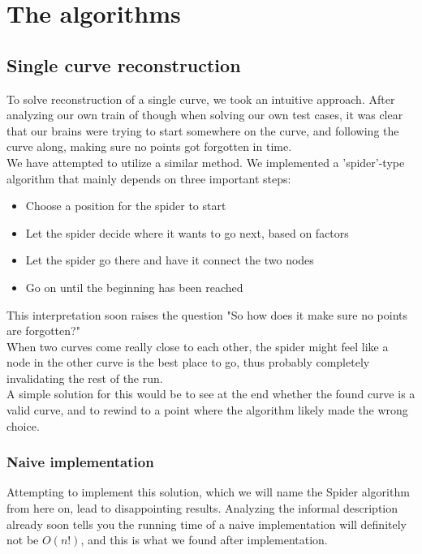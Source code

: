 \documentclass[11pt]{article}
\begin{document}
\newpage
\section{The algorithms}
\label{se:algorithms}

\subsection{Single curve reconstruction}
To solve reconstruction of a single curve, we took an intuitive approach. After analyzing our own train of though when solving our own test cases, it was clear that our brains were trying to start somewhere on the curve, and following the curve along, making sure no points got forgotten in time.\\

We have attempted to utilize a similar method. We implemented a 'spider'-type algorithm that mainly depends on three important steps:
\begin{itemize}
\item Choose a position for the spider to start
\item Let the spider decide where it wants to go next, based on factors
\item Let the spider go there and have it connect the two nodes
\item Go on until the beginning has been reached
\end{itemize}

This interpretation soon raises the question "So how does it make sure no points are forgotten?"\\
When two curves come really close to each other, the spider might feel like a node in the other curve is the best place to go, thus probably completely invalidating the rest of the run.\\

A simple solution for this would be to see at the end whether the found curve is a valid curve, and to rewind to a point where the algorithm likely made the wrong choice.\\

\subsubsection{Naive implementation} 

Attempting to implement this solution, which we will name the Spider algorithm from here on, lead to disappointing results. Analyzing the informal description already soon tells you the running time of a naive implementation will definitely not be $O(n!)$, and this is what we found after implementation.\\
\end{document}
